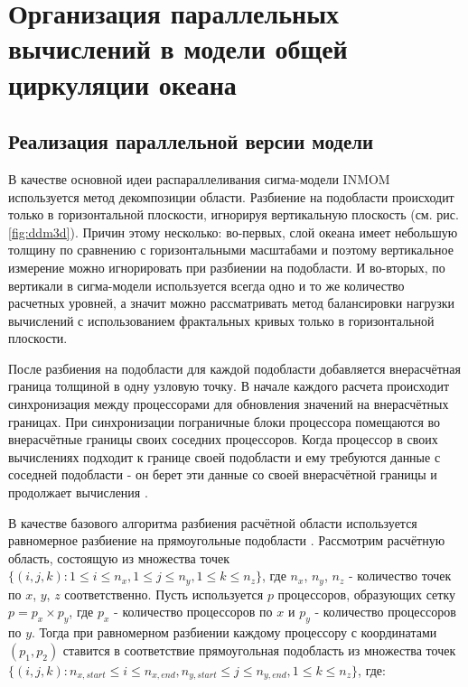\chapter{Организация параллельных вычислений в модели общей циркуляции океана}\label{ch:inmsom/ch2}

\section{Реализация параллельной версии модели}\label{sec:inmsom/ch2/sec1}
    В качестве основной идеи распараллеливания сигма-модели INMOM используется метод декомпозиции области.
    Разбиение на подобласти происходит только в горизонтальной плоскости, игнорируя вертикальную плоскость (см. рис. \ref{fig:ddm3d}). 
    Причин этому несколько: во-первых, слой океана имеет небольшую толщину по сравнению с горизонтальными масштабами и поэтому вертикальное измерение можно игнорировать
	при разбиении на подобласти.
	И во-вторых, по вертикали в сигма-модели используется всегда одно и то же количество
	расчетных уровней, а значит можно рассматривать метод балансировки нагрузки вычислений с использованием фрактальных кривых только в горизонтальной плоскости.

    После разбиения на подобласти для каждой подобласти добавляется внерасчётная граница толщиной в одну узловую точку. 
    В начале каждого расчета происходит синхронизация между процессорами для обновления значений на внерасчётных границах.
    При синхронизации пограничные блоки процессора помещаются во внерасчётные границы своих соседних процессоров.
    Когда процессор в своих вычислениях подходит к границе своей подобласти и ему требуются данные с соседней подобласти - он берет эти данные 
    со своей внерасчётной границы и продолжает вычисления \cite{GuansuoWang}.
   
    
    В качестве базового алгоритма разбиения расчётной области используется равномерное разбиение на прямоугольные подобласти \cite{ChaplyginINMOM2017}.     
    Рассмотрим расчётную область, состоящую из множества точек $\{ (i, j, k) : 1 \leq i \leq n_x,  1 \leq j \leq n_y, 1 \leq k \leq n_z \}$,
    где $n_x$, $n_y$, $n_z$ - количество точек по $x$, $y$, $z$ соответственно. 
    Пусть используется $p$ процессоров, образующих сетку $p = p_{x} \times p_{y}$,
    где $p_x$ - количество процессоров по $x$ и $p_y$ - количество процессоров по $y$. 
    Тогда при равномерном разбиении каждому процессору с координатами $(p_1, p_2)$ ставится в соответствие прямоугольная подобласть из множества точек
    $\{ (i, j, k) :  n_{x, start} \leq i \leq n_{x, end} , n_{y, start} \leq j \leq n_{y, end}, 1 \leq k \leq n_z \}$, где:  
    
